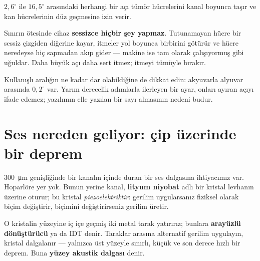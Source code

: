 \documentclass[11pt,a4paper]{article}
\begin{document}
$2,6^\circ$ ile $16,5^\circ$ arasındaki herhangi bir açı tümör hücrelerini kanal
boyunca taşır ve kan hücrelerinin düz geçmesine izin verir.

\begin{warnbox}
Sınırın ötesinde cihaz \textbf{sessizce hiçbir şey yapmaz}. Tutunamayan hücre bir
sessiz çizgiden diğerine kayar, itmeler yol boyunca birbirini götürür ve hücre
neredeyse hiç sapmadan akıp gider --- makine ise tam olarak çalışıyormuş gibi
uğuldar. Daha büyük açı daha sert itmez; itmeyi tümüyle bırakır.
\end{warnbox}

Kullanışlı aralığın ne kadar dar olabildiğine de dikkat edin: akyuvarla alyuvar
arasında $0,2^\circ$ var. Yarım derecelik adımlarla ilerleyen bir ayar, onları
ayıran açıyı ifade edemez; yazılımın elle yazılan bir sayı almasının nedeni budur.

\section{Ses nereden geliyor: çip üzerinde bir deprem}

\SI{300}{\micro\meter} genişliğinde bir kanalın içinde duran bir ses dalgasına
ihtiyacımız var. Hoparlöre yer yok. Bunun yerine kanal, \textbf{lityum niyobat}
adlı bir kristal levhanın üzerine oturur; bu kristal \emph{piezoelektriktir}:
gerilim uygularsanız fiziksel olarak biçim değiştirir, biçimini değiştirirseniz
gerilim üretir.

O kristalin yüzeyine iç içe geçmiş iki metal tarak yatırırız; bunlara
\textbf{arayüzlü dönüştürücü} ya da IDT denir. Taraklar arasına alternatif
gerilim uygulayın, kristal dalgalanır --- yalnızca üst yüzeyle sınırlı, küçük ve
son derece hızlı bir deprem. Buna \textbf{yüzey akustik dalgası} denir.
\end{document}
